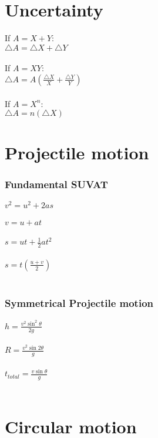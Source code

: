 \documentclass[11pt]{article}
\begin{document}
    \section{Uncertainty}\label{sec:uncertainty}
    If $A = X + Y$: \\
    $\bigtriangleup A = \bigtriangleup X + \bigtriangleup Y$ \\ \\
    If $A = XY$: \\
    $\bigtriangleup A = A\left(\frac{\bigtriangleup X}{X} + \frac{\bigtriangleup Y}{Y}\right)$ \\ \\
    If $A = X^n$: \\
    $\bigtriangleup A = n\left(\bigtriangleup X\right)$


    \section{Projectile motion}\label{sec:projectile-motion}

    \subsubsection{Fundamental SUVAT}
    $v^2 = u^2 + 2as$ \\ \\
    $v = u + at$ \\  \\
    $s = ut + \frac{1}{2}at^2$ \\\\
    $s = t\left(\frac{u+v}{2}\right)$ \\\\

    \subsubsection{Symmetrical Projectile motion}
    $h = \frac{v^2 \sin^2\theta}{2g}$ \\ \\
    $R = \frac{v^2 \sin 2\theta}{g}$ \\ \\
    $t_{total} = \frac{v \sin\theta}{g}$ \\ \\

    \section{Circular motion}\label{sec:circular-motion}
\end{document}
